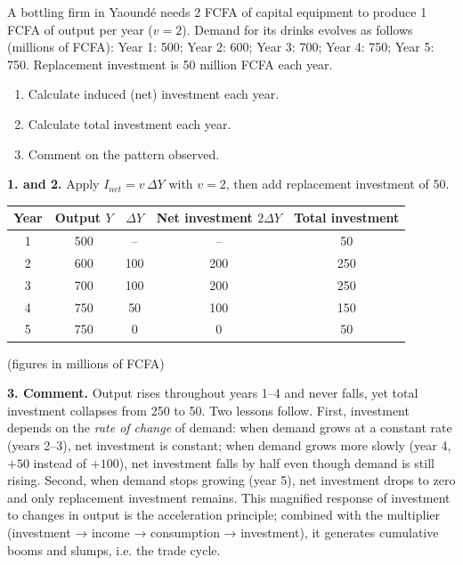 \documentclass[11pt]{article}
\begin{document}
\begin{exoresolu}
A bottling firm in Yaoundé needs 2 FCFA of capital equipment to produce 1 FCFA of output per year ($v = 2$). Demand for its drinks evolves as follows (millions of FCFA): Year 1: 500; Year 2: 600; Year 3: 700; Year 4: 750; Year 5: 750. Replacement investment is 50 million FCFA each year.
\begin{enumerate}
\item Calculate induced (net) investment each year.
\item Calculate total investment each year.
\item Comment on the pattern observed.
\end{enumerate}
\tcblower
\textbf{1. and 2.} Apply $I_{net} = v\,\Delta Y$ with $v = 2$, then add replacement investment of 50.

\begin{center}
\begin{tabular}{|c|c|c|c|c|}
\hline
\rowcolor{popblueL} Year & Output $Y$ & $\Delta Y$ & Net investment $2\Delta Y$ & Total investment \\
\hline
1 & 500 & -- & -- & 50 \\
\hline
2 & 600 & 100 & 200 & 250 \\
\hline
3 & 700 & 100 & 200 & 250 \\
\hline
4 & 750 & 50 & 100 & 150 \\
\hline
5 & 750 & 0 & 0 & 50 \\
\hline
\end{tabular}
\end{center}

(figures in millions of FCFA)

\textbf{3. Comment.} Output rises throughout years 1--4 and never falls, yet total investment collapses from 250 to 50. Two lessons follow. First, investment depends on the \emph{rate of change} of demand: when demand grows at a constant rate (years 2--3), net investment is constant; when demand grows more slowly (year 4, $+50$ instead of $+100$), net investment falls by half even though demand is still rising. Second, when demand stops growing (year 5), net investment drops to zero and only replacement investment remains. This magnified response of investment to changes in output is the acceleration principle; combined with the multiplier (investment → income → consumption → investment), it generates cumulative booms and slumps, i.e. the trade cycle.
\end{exoresolu}
\end{document}
